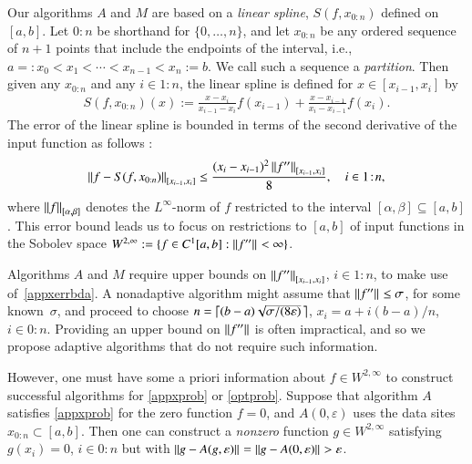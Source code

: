 \documentclass[review]{elsarticle}
\newcommand{\abstol}{\varepsilon}
\newcommand{\zton}{0\!:\!n}
\newcommand{\oton}{1\!:\!n}
\newcommand{\datasites}{x_{0:n}}
\theoremstyle{definition}
\renewcommand{\cw}{W}
\begin{document}
Our algorithms $A$ and $M$ are based on a \emph{linear spline}, $S(f,\datasites)$ 
defined on $[a,b]$.  Let ${0\!:\!n}$ be shorthand for $\{0, \ldots, n\}$, and let 
$\datasites$ be any
ordered sequence of $n+1$ points that include the endpoints of the interval,
i.e., $a=:x_0 <x_1 < \cdots < x_{n-1} < x_{n}:=b$. We call such a sequence a
\emph{partition}. Then given any $\datasites$ and any $i \in \oton$, the linear 
spline  is defined for $x \in [x_{i-1},x_i]$ by
\begin{align} \label{splinedef}
   S(f,\datasites)(x) :=
   \frac{x-x_i}{x_{i-1} - x_i} f(x_{i-1}) + \frac{x-x_{i-1}}{x_{i} - x_{i-1}}f(x_i).
\end{align}
The error of the linear spline is bounded in terms
of the second derivative of the input function as follows \cite[Theorem
3.3]{BurFaiBur16a}:
\begin{equation} \label{appxerrbda}
	\norm[{[x_{i-1},x_i]}]{f - S(f,\datasites)}
	\le \frac{(x_i - x_{i-1})^2\norm[{[x_{i-1},x_i]}]{f''}}{8}, \quad i \in \oton,
\end{equation}
where $\norm[{[\alpha,\beta]}]{f}$ denotes the $L^{\infty}$-norm of $f$ restricted to the
interval $[\alpha,\beta] \subseteq [a,b]$. This error bound leads us to focus on restrictions to $[a,b]$ of 
input functions in the Sobolev space $\cw^{2,\infty}:= \{f \in C^1[a,b] :
\norm{f''} < \infty \}$.

Algorithms $A$ and $M$ require upper bounds on $\norm[{[x_{i-1},x_i]}]{f''}$, $i \in
1\!:\!n$,
to make use of~\eqref{appxerrbda}. A nonadaptive algorithm might assume that
$\norm{f''} \le \sigma$, for some known~$\sigma$, and proceed to choose $n =
\bigl \lceil (b-a)\smash{\sqrt{\sigma/(8 \varepsilon)}} \, \bigr \rceil$, $x_i = a +
i(b-a)/n$, $i \in 0\!:\!n$. Providing an upper bound on $\norm{f''}$ is
often impractical, and so we propose adaptive algorithms that do not
require such information.

However, one must have some a priori information about $f \in \cw^{2,\infty}$
to construct successful algorithms for \eqref{appxprob} or \eqref{optprob}.
Suppose that algorithm $A$ satisfies \eqref{appxprob} for the zero function $f=0$, and
$A(0,\varepsilon)$ uses the data sites $x_{0:n}\subset [a,b]$. Then one can
construct a \emph{nonzero} function $g \in \cw^{2,\infty}$ satisfying $g(x_i) =
0$, $i\in \zton$ but with $\smash{\norm{g- A(g,\abstol)}} = \smash{\norm{g -
A(0,\abstol)}} > \varepsilon$.
\end{document}
